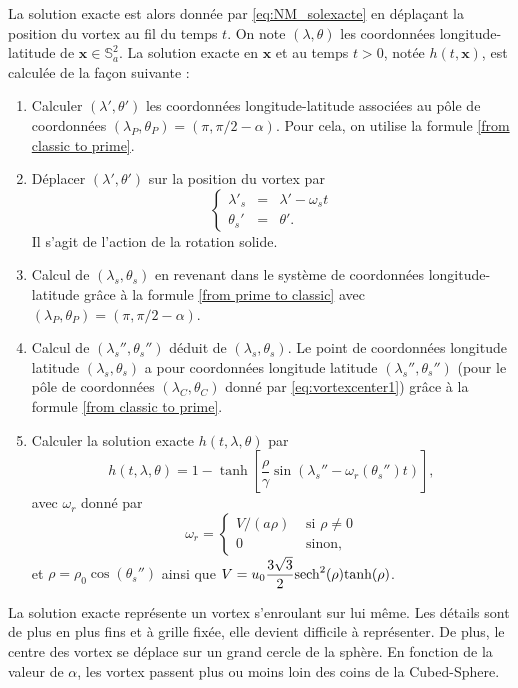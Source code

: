 La solution exacte est alors donnée par \eqref{eq:NM_solexacte} en déplaçant la position du vortex au fil du temps $t$. On note $(\lambda, \theta)$ les coordonnées longitude-latitude de $\mathbf{x} \in \mathbb{S}_a^2$.
La solution exacte en $\mathbf{x}$ et au temps $t>0$, notée $h(t,\mathbf{x})$, est calculée de la façon suivante :
\begin{enumerate}
\item Calculer $(\lambda', \theta')$ les coordonnées longitude-latitude associées au pôle de coordonnées $(\lambda_P, \theta_P) = (\pi, \pi/2 - \alpha)$. Pour cela, on utilise la formule \eqref{from classic to prime}.

\item Déplacer $(\lambda', \theta')$ sur la position du vortex par
\begin{equation}
\label{eq:vortexcenter}
\left\lbrace
\begin{array}{rcl}
\lambda'_s & = & \lambda' - \omega_s t \\
\theta_s' & = & \theta'.
\end{array}
\right.
\end{equation}
Il s'agit de l'action de la rotation solide.

\item Calcul de $(\lambda_s, \theta_s)$ en revenant dans le système de coordonnées longitude-latitude grâce à la formule \eqref{from prime to classic} avec $(\lambda_P, \theta_P) = (\pi, \pi/2 - \alpha)$.

\item Calcul de $(\lambda_s'', \theta_s'')$ déduit de $(\lambda_s, \theta_s)$. Le point de coordonnées longitude latitude $(\lambda_s, \theta_s)$ a pour coordonnées longitude latitude $(\lambda_s'', \theta_s'')$ (pour le pôle de coordonnées $(\lambda_C, \theta_C)$ donné par \eqref{eq:vortexcenter1}) grâce à la formule \eqref{from classic to prime}.

\item Calculer la solution exacte $h(t,\lambda, \theta)$ par
\begin{equation}
h(t,\lambda, \theta) = 1 - \tanh \left[ \dfrac{\rho}{\gamma} \sin (\lambda_s'' - \omega_r(\theta_s'')t) \right],
\label{eq:NJ_solexacte}
\end{equation}
avec $\omega_r$ donné par
\begin{equation}
\omega_r = \left\lbrace
\begin{array}{cl}
V/(a \rho) & \text{ si } \rho \neq 0 \\
0 & \text{ sinon,}
\end{array}
\right.
\end{equation}
et $\rho = \rho_0 \cos (\theta_s'')$ ainsi que $V = u_0 \dfrac{3\sqrt{3}}{2} \text{sech}^2(\rho) \text{tanh}(\rho)$.
\end{enumerate}
La solution exacte représente un vortex s'enroulant sur lui même. Les détails sont de plus en plus fins et à grille fixée, elle devient difficile à représenter. De plus, le centre des vortex se déplace sur un grand cercle de la sphère. En fonction de la valeur de $\alpha$, les vortex passent plus ou moins loin des coins de la Cubed-Sphere.

